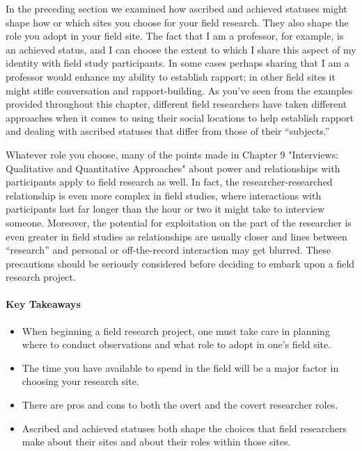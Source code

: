 In the preceding section we examined how ascribed and achieved statuses might shape how or which sites you choose for your field research. They also shape the role you adopt in your field site. The fact that I am a professor, for example, is an achieved status, and I can choose the extent to which I share this aspect of my identity with field study participants. In some cases perhaps sharing that I am a professor would enhance my ability to establish rapport; in other field sites it might stifle conversation and rapport-building. As you’ve seen from the examples provided throughout this chapter, different field researchers have taken different approaches when it comes to using their social locations to help establish rapport and dealing with ascribed statuses that differ from those of their “subjects.”

Whatever role you choose, many of the points made in Chapter 9 "Interviews: Qualitative and Quantitative Approaches" about power and relationships with participants apply to field research as well. In fact, the researcher-researched relationship is even more complex in field studies, where interactions with participants last far longer than the hour or two it might take to interview someone. Moreover, the potential for exploitation on the part of the researcher is even greater in field studies as relationships are usually closer and lines between “research” and personal or off-the-record interaction may get blurred. These precautions should be seriously considered before deciding to embark upon a field research project.

\paragraph{Key Takeaways}

\begin{itemize}
	\setlength{\itemsep}{0pt}
	\setlength{\parskip}{0pt}
	\setlength{\parsep}{0pt}
	
	\item When beginning a field research project, one must take care in planning where to conduct observations and what role to adopt in one’s field site.
	\item The time you have available to spend in the field will be a major factor in choosing your research site.
	\item There are pros and cons to both the overt and the covert researcher roles.
	\item Ascribed and achieved statuses both shape the choices that field researchers make about their sites and about their roles within those sites.
	
\end{itemize}

